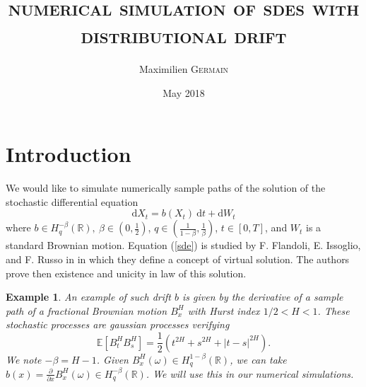 \documentclass[12pt]{article}
\newcommand{\pade}[2]{\frac{\partial #1}{\partial #2}}
\newtheorem{ex}{Example}
\newcommand{\R}{\mathbb{R}}
\newcommand{\E}{\mathbb{E}}
\newcommand{\di}{\mathrm{d}}
\begin{document}
\title{\Large \textsc{\textbf{numerical simulation of sdes with distributional drift}}} \author{Maximilien \textsc{Germain} \date{May 2018}}
\maketitle

\section{Introduction}
    
    \paragraph{}
    We would like to simulate numerically sample paths of the solution of the stochastic differential equation
    \begin{equation} \label{sde}
    \di X_t = b(X_t)\ \di t + \di W_t
    \end{equation}
    where $b\in H^{-\beta}_q(\R),\ \beta\in\left(0,\frac{1}{2}\right)$, $q\in\left(\frac{1}{1-\beta},\frac{1}{\beta}\right)$, $t\in[0,T]$, and $W_t$ is a standard Brownian motion. Equation (\ref{sde}) is studied by F. Flandoli, E. Issoglio, and F. Russo in \cite{Fla-Iss-Rus-2017} in which they define a concept of virtual solution. The authors prove then existence and unicity in law of this solution. 
    
    \begin{ex}
        An example of such drift $b$ is given by the derivative of a sample path of a fractional Brownian motion $B^H_x$ with Hurst index $1/2<H<1$. These stochastic processes are gaussian processes verifying $$\E\left[B_t^HB_s^H\right]=\frac{1}{2}\left(t^{2H}+s^{2H}+|t-s|^{2H}\right).$$ We note $-\beta = H - 1$. Given $B^H_x(\omega)\in H^{1-\beta}_q(\R)$, we can take $b(x) = \pade{}{x}B^H_x(\omega)\in H^{-\beta}_q(\R)$. We will use this in our numerical simulations.
    \end{ex}    
    
\end{document}
